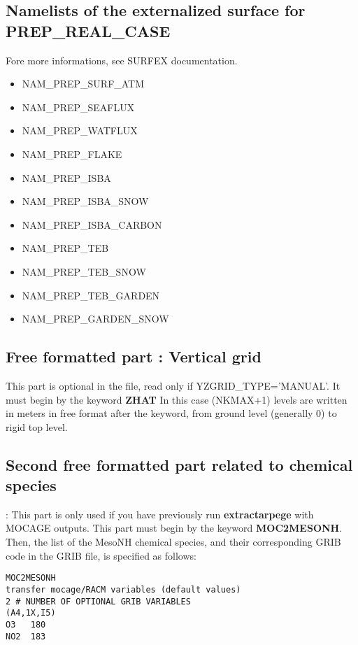 \subsection{Namelists of the externalized surface for PREP\_REAL\_CASE} \label{surfex_prep}
Fore more informations, see SURFEX documentation.
\begin{itemize}
\item NAM\_PREP\_SURF\_ATM
\item NAM\_PREP\_SEAFLUX
\item NAM\_PREP\_WATFLUX
\item NAM\_PREP\_FLAKE
\item NAM\_PREP\_ISBA
\item NAM\_PREP\_ISBA\_SNOW
\item NAM\_PREP\_ISBA\_CARBON
\item NAM\_PREP\_TEB
\item NAM\_PREP\_TEB\_SNOW
\item NAM\_PREP\_TEB\_GARDEN
\item NAM\_PREP\_GARDEN\_SNOW
\end{itemize}


\subsection{Free formatted part : Vertical grid}

This part is optional in the file, read only if YZGRID\_TYPE='MANUAL'.
It must begin by the keyword {\bf ZHAT}
In this case (NKMAX+1) levels are written in meters in free format after the keyword, 
from ground level (generally 0) to rigid top level.

\subsection{Second free formatted part related to chemical species}:
This part is only used if you have previously run {\bf extractarpege}
with MOCAGE outputs. This part must begin by the keyword {\bf MOC2MESONH}.
Then, the list of the MesoNH chemical species, and
their corresponding GRIB code in the GRIB file, is specified as follows: 
\begin{verbatim}
MOC2MESONH
transfer mocage/RACM variables (default values)
2 # NUMBER OF OPTIONAL GRIB VARIABLES
(A4,1X,I5)
O3   180
NO2  183
\end{verbatim}

